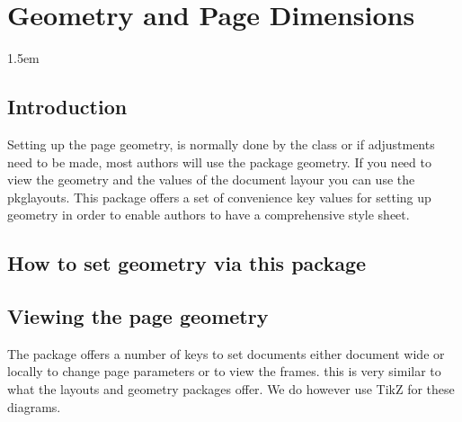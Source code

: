 {
}




\chapter{Geometry and Page Dimensions}
\parindent1.5em
\section{Introduction}









Setting up the page geometry, is normally done by the class or if adjustments need to be made, most authors will use the package geometry. If you need to view the geometry and the values of the document layour you can use the pkg{layouts}. This package offers a set of convenience key values for setting up geometry in order to enable authors to have a comprehensive style sheet.

\section{How to set geometry via this package}

\section{Viewing the page geometry}

The package offers a number of keys to set documents either document wide or locally to change page 
parameters or to view the frames. this is very similar to what the layouts and geometry packages offer. We do
however use TikZ for these diagrams.

